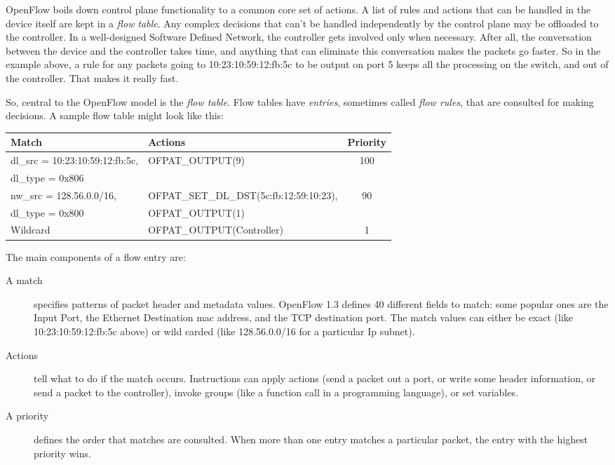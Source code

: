 OpenFlow boils down control plane functionality to a common core set of actions.
A list of rules and actions that can be handled in the device itself are kept in a \textit{flow table}.
Any complex decisions that can't be handled independently by the control plane may be offloaded to the controller.  
In a well-designed Software Defined Network, the controller gets involved only when necessary.
After all, the conversation between the device and the controller takes time, and anything that can 
eliminate this conversation makes the packets go faster.
So in the example above, a rule for any packets going to 10:23:10:59:12:fb:5c to be output on port 5 keeps all the processing on the switch, and out of the controller.  
That makes it really fast.  

So, central to the OpenFlow model is the \textit{flow table}.  
Flow tables have \textit{entries}, sometimes called \textit{flow rules}, that are consulted for making decisions.
A sample flow table might look like this:

\bigskip
\begin{tabularx}{6in}{|l|l|c|}
\hline\hline
Match & Actions & Priority
\\ \hline
dl\_src = 10:23:10:59:12:fb:5c, & OFPAT\_OUTPUT(9) & 100
\\
dl\_type = 0x806 & &  
\\ \hline
nw\_src = 128.56.0.0/16, & OFPAT\_SET\_DL\_DST(5c:fb:12:59:10:23), & 90 
\\
dl\_type = 0x800 & OFPAT\_OUTPUT(1) &
\\ \hline
Wildcard & OFPAT\_OUTPUT(Controller) & 1
\\ \hline\hline
\end{tabularx}

\bigskip

The main components of a flow entry are:

\begin{description}
\item[A match] specifies patterns of packet header and metadata values.
OpenFlow 1.3 defines 40 different fields to match: some popular ones are the Input Port, 
the Ethernet Destination mac address, and the TCP destination port.
The match values can either be exact (like 10:23:10:59:12:fb:5c above) or wild carded (like 128.56.0.0/16 for a
particular Ip subnet).
\item[Actions] tell what to do if the match occurs.  
Instructions can apply actions (send a packet out a port, or write some header information, 
or send a packet to the controller), 
invoke groups (like a function call in a programming language), or set variables.
\item[A priority] defines the order that matches are consulted.  
When more than one entry matches a particular packet, the entry with the highest priority wins.
\end{description}

